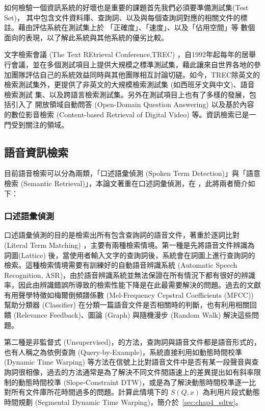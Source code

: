如何檢驗一個資訊系統的好壞也是重要的課題首先我們必須要準備測試集(Test Set)，
其中包含文件資料庫、查詢詞、以及與每個查詢詞對應的相關文件的標註。藉由評估系統在測試集上於 「正確度」、「速度」、以及「佔用空間」等
數個面向的表現，以了解此系統與其他系統的優劣比較。

文字檢索會議 (The Text REtrieval Conference,TREC)
，自1992年起每年的居舉行會議，並在多個測試項目上提供大規模之標準測試集，藉此讓來自世界各地的參加團隊評估自己的系統效益同時與其他團隊相互討論切磋。如今，TREC除英文的檢索測試集外，更提供了非英文的大規模檢索測試集 (如西班牙文與中文)、語音檢索測試
集、以及跨語言檢索測試集。另外在測試項目上也有了多樣的發展，包括引入了
開放領域自動問答 (Open-Domain Question Answering)
以及基於內容的數位影音檢索 (Content-based Retrieval of Digital Video)
等。資訊檢索已是一門受到關注的領域。



\subsection{語音資訊檢索}
目前語音檢索可以分為兩類，「口述語彙偵測 (Spoken Term Detection)」與「語意檢索 (Semantic Retrieval)」，本論文著重在口述詞彙偵測，在
，此將兩者簡介如下：

\subsubsection{口述語彙偵測}


口述語彙偵測的目的是檢索出所有包含查詢詞的語音文件，著重於逐詞比對(Literal Term Matching) ，主要有兩種檢索情境。第一種是先將語音文件辨識為詞圖(Lattice)
後，當使用者輸入文字的查詢詞後，系統會在詞圖上進行查詢詞的檢索。這種檢索情境需要有訓練好的自動語音辨識系統
(Automatic Speech Recognition,
ASR)，由於語音辨識系統並無法保證在所有情況下都有很好的辨識率，因此由辨識錯誤所導致的檢索性能下降是在此最需要解決的問題。過去的文獻有用聲學特徵如梅爾倒頻譜係數
(Mel-Frequency Cepstral Coefficients (MFCC)) 幫助分類器 (Classifier)
在分類一篇語音文件是否相關時的判斷，也有利用相關回饋 (Relevance Feedback)、圖論 (Graph) 與隨機漫步 (Random Walk)
解決這些問題。

第二種是非監督式
(Unsupervised)，的方法，查詢詞與語音文件都是語音形式的，也有人稱之為依例查詢
(Query-by-Example)，系統直接利用如動態時間校準 (Dynamic Time Warping)
等方法在信號上比對語音文件中是否有某一段聲音與查詢詞很相像，過去的方法通常是為了解決不同文件間語速上的差異提出如有斜率限制的動態時間校準
(Slope-Constraint DTW)，或是為了解決動態時間校準逐一比對所有文件庫所花時間過多的問題。計算此情境下的 $S(Q, x)$ 為利用片段式動態時間規劃 (Segmental Dynamic Time Warping)，簡介於~\ref{sec:chap4_sdtw}。

